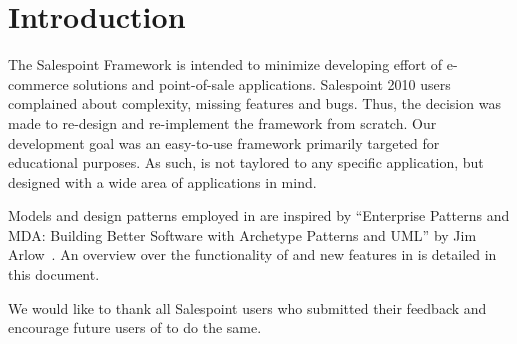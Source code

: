 \chapter{Introduction}
The Salespoint Framework is intended to minimize developing effort of e-commerce solutions and point-of-sale applications.
Salespoint 2010 users complained about complexity, missing features and bugs.
Thus, the decision was made to re-design and re-implement the framework from scratch.
Our development goal was an easy-to-use framework primarily targeted for educational purposes.
As such, \salespoint is not taylored to any specific application, but designed with a wide area of applications in mind.

Models and design patterns employed in \salespoint are inspired by ``Enterprise Patterns and MDA: Building Better Software with Archetype Patterns and UML'' by Jim Arlow~\cite{MDA}.
An overview over the functionality of and new features in \salespoint is detailed in this document.

We would like to thank all Salespoint users who submitted their feedback and encourage future users of \salespoint to do the same.
